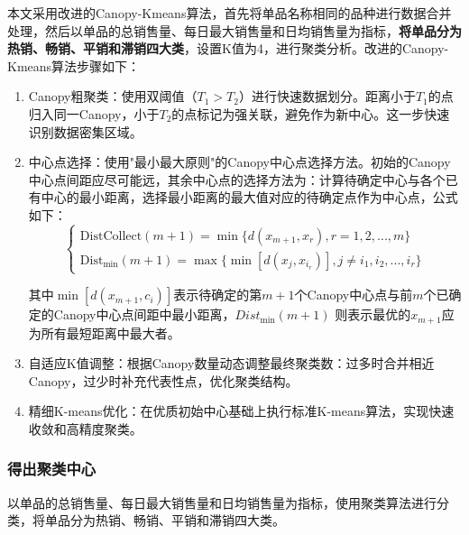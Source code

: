 \documentclass{article}
\begin{document}
	本文采用改进的Canopy-Kmeans算法，首先将单品名称相同的品种进行数据合并处理，然后以单品的总销售量、每日最大销售量和日均销售量为指标，\textbf{将单品分为热销、畅销、平销和滞销四大类}，设置K值为4，进行聚类分析。改进的Canopy-Kmeans算法步骤如下：
	\begin{enumerate}[label=\arabic*.]
		\item{Canopy粗聚类}：使用双阈值（$T_1 > T_2$）进行快速数据划分。距离小于$T_1$的点归入同一Canopy，小于$T_2$的点标记为强关联，避免作为新中心。这一步快速识别数据密集区域。
		\item{中心点选择}：使用"最小最大原则"的Canopy中心点选择方法。初始的Canopy中心点间距应尽可能远，其余中心点的选择方法为：计算待确定中心与各个已有中心的最小距离，选择最小距离的最大值对应的待确定点作为中心点，公式如下：
		\[
		\begin{cases} 
			\text{DistCollect}(m+1) = \min \{ d(x_{m+1}, x_r), r = 1, 2, ..., m \} \\
			\text{Dist}_{\min}(m+1) = \max \{ \min [d(x_j, x_{i_r})], j \neq i_1, i_2, ..., i_r \}
		\end{cases} \tag{1}
		\]
		
		其中$\min[d(x_{m+1}, c_i)]$表示待确定的第$m+1$个Canopy中心点与前$m$个已确定的Canopy中心点间距中最小距离，$Dist_{\min} (m+1)$ 则表示最优的$x_{m+1}$应为所有最短距离中最大者\cite{mao2012}。
		
		\item{自适应K值调整}：根据Canopy数量动态调整最终聚类数：过多时合并相近Canopy，过少时补充代表性点，优化聚类结构。
		
		\item{精细K-means优化}：在优质初始中心基础上执行标准K-means算法，实现快速收敛和高精度聚类。
	\end{enumerate}
	
	\subsubsection{得出聚类中心}
	
	以单品的总销售量、每日最大销售量和日均销售量为指标，使用聚类算法进行分类，将单品分为热销、畅销、平销和滞销四大类。
	
\end{document}
